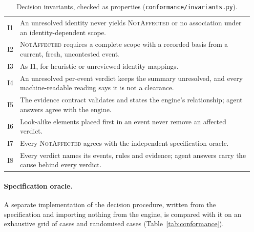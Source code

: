 \documentclass[11pt]{article}
\newcommand{\code}[1]{\texttt{#1}}
\begin{document}
\begin{table}[t]
\centering\small
\caption{Decision invariants, checked as properties (\code{conformance/invariants.py}).}
\label{tab:invariants}
\begin{tabularx}{\linewidth}{lX}
\toprule
I1 & An unresolved identity never yields \textsc{NotAffected} or no association under an identity-dependent scope. \\
I2 & \textsc{NotAffected} requires a complete scope with a recorded basis from a current, fresh, uncontested event. \\
I3 & As I1, for heuristic or unreviewed identity mappings. \\
I4 & An unresolved per-event verdict keeps the summary unresolved, and every machine-readable reading says it is not a clearance. \\
I5 & The evidence contract validates and states the engine's relationship; agent answers agree with the engine. \\
I6 & Look-alike elements placed first in an event never remove an affected verdict. \\
I7 & Every \textsc{NotAffected} agrees with the independent specification oracle. \\
I8 & Every verdict names its events, rules and evidence; agent answers carry the cause behind every verdict. \\
\bottomrule
\end{tabularx}
\end{table}

\paragraph{Specification oracle.} A separate implementation of the decision
procedure, written from the specification and importing nothing from the
engine, is compared with it on an exhaustive grid of \MatrixCases{} cases and
\RandCases{} randomised cases (Table~\ref{tab:conformance}).
\end{document}
